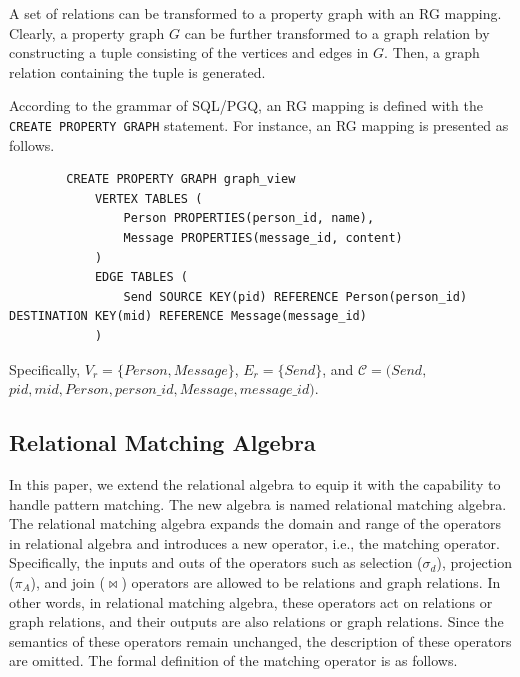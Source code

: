 A set of relations can be transformed to a property graph with an RG mapping.
Clearly, a property graph $G$ can be further transformed to a graph relation by constructing a tuple consisting of the vertices and edges in $G$.
Then, a graph relation containing the tuple is generated.

\begin{example}
    According to the grammar of SQL/PGQ, an RG mapping is defined with the \lstinline{CREATE PROPERTY GRAPH} statement.
    For instance, an RG mapping is presented as follows.
    \begin{lstlisting}
        CREATE PROPERTY GRAPH graph_view
            VERTEX TABLES (
                Person PROPERTIES(person_id, name),
                Message PROPERTIES(message_id, content)
            )
            EDGE TABLES (
                Send SOURCE KEY(pid) REFERENCE Person(person_id) DESTINATION KEY(mid) REFERENCE Message(message_id)
            )
    \end{lstlisting}
    Specifically, $V_r = \{Person, Message\}$, $E_r = \{Send\}$, and $\mathcal{C} = (Send,$ $pid, mid, Person, person\_id, Message, message\_id)$.

\end{example}


\subsection{Relational Matching Algebra}
\label{sec:graph-relational-algebra}

In this paper, we extend the relational algebra to equip it with the capability to handle pattern matching.
The new algebra is named relational matching algebra.
The relational matching algebra expands the domain and range of the operators in relational algebra and introduces a new operator, i.e., the matching operator.
Specifically, the inputs and outs of the operators such as selection ($\sigma_d$), projection ($\pi_A$), and join ($\Join$) operators are allowed to be relations and graph relations.
In other words, in relational matching algebra, these operators act on relations or graph relations, and their outputs are also relations or graph relations.
Since the semantics of these operators remain unchanged, the description of these operators are omitted.
The formal definition of the matching operator is as follows.

